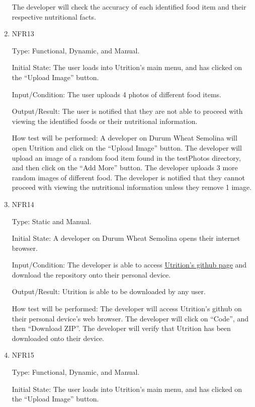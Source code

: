 \documentclass[12pt, titlepage]{article}
\begin{document}
\begin{enumerate}
		The developer will check the accuracy of each identified food item and their respective nutritional facts.
		
		\item{NFR13\\} 
		
		Type: Functional, Dynamic, and Manual.
		
		Initial State: The user loads into Utrition’s main menu, and has clicked on the “Upload Image” button.
		
		Input/Condition: The user uploads 4 photos of different food items.
		
		Output/Result: The user is notified that they are not able to proceed with viewing the identified foods or their nutritional information.
		
		How test will be performed: A developer on Durum Wheat Semolina will open Utrition and click on the “Upload Image” button. The developer will upload an image of a random food item found in the testPhotos directory, and then click on the “Add More” button. The developer uploads 3 more random images of different food. The developer is notified that they cannot proceed with viewing the nutritional information unless they remove 1 image.
		
		\item{NFR14\\} 
		
		Type: Static and Manual.
		
		Initial State: A developer on Durum Wheat Semolina opens their internet browser.
		
		Input/Condition: The developer is able to access \href{https://github.com/jeff-rey-wang/utrition}{Utrition’s github page} and download the repository onto their personal device.
		
		Output/Result: Utrition is able to be downloaded by any user.
		
		How test will be performed: The developer will access Utrition’s github on their personal device’s web browser. The developer will click on “Code”, and then “Download ZIP”. The developer will verify that Utrition has been downloaded onto their device.
		
		\item{NFR15\\} 
		
		Type: Functional, Dynamic, and Manual.
		
		Initial State: The user loads into Utrition’s main menu, and has clicked on the “Upload Image” button.
		

\end{enumerate}
\end{document}
